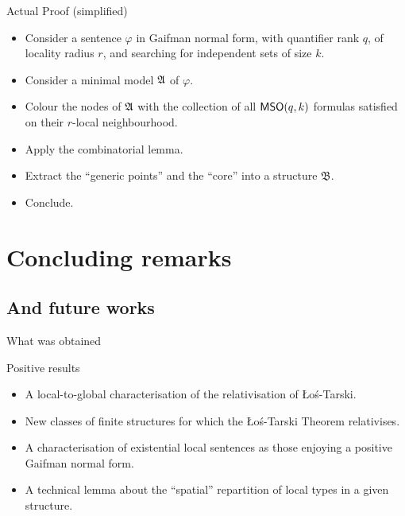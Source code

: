 \documentclass{beamer}
\begin{document}
\begin{frame}{Actual Proof \hfill (simplified)}
    \begin{itemize}[<+->]
        \item Consider a sentence $\varphi$ in Gaifman normal form,
            with quantifier rank $q$, of locality radius $r$,
            and searching for independent sets of size $k$.
        \item Consider a minimal model $\mathfrak{A}$ of $\varphi$.
        \item Colour the nodes of $\mathfrak{A}$ with
            the collection of all $\mathsf{MSO}(q,k)$
            formulas satisfied on their $r$-local neighbourhood.
        \item Apply the combinatorial lemma.
        \item Extract the ``generic points'' and the ``core'' into a structure $\mathfrak{B}$.
        \item Conclude.
    \end{itemize}
\end{frame}

\section{Concluding remarks}
\subsection{And future works}

\begin{frame}{What was obtained}
    \begin{alertblock}{Positive results}
        \begin{itemize}
        \item
          A local-to-global characterisation of the relativisation of Łoś-Tarski.
        \item
          New classes of finite structures for which the Łoś-Tarski Theorem
          relativises.
        \item
          A characterisation of existential local sentences as those enjoying a
          positive Gaifman normal form.
        \item
          A technical lemma about the ``spatial'' repartition of local types in
          a given structure.
        \end{itemize}
    \end{alertblock}
\end{frame}
\end{document}
